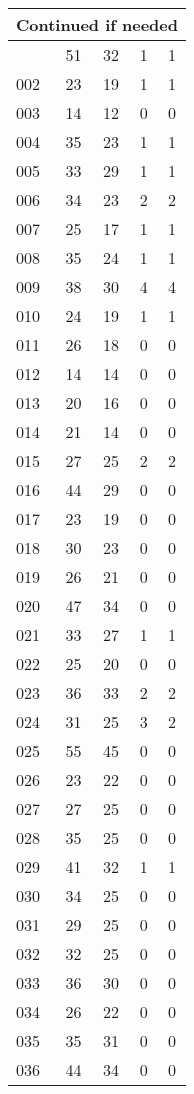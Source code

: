 \begin{center}
\begin{longtable}{l|c|c|c|c}
\hline \multicolumn{5}{|r|}{{Continued if needed}} \\ \hline
\endfoot 
001 & 51 & 32 & 1 & 1\\ \hline
002 & 23 & 19 & 1 & 1\\ \hline
003 & 14 & 12 & 0 & 0\\ \hline
004 & 35 & 23 & 1 & 1\\ \hline
005 & 33 & 29 & 1 & 1\\ \hline
006 & 34 & 23 & 2 & 2\\ \hline
007 & 25 & 17 & 1 & 1\\ \hline
008 & 35 & 24 & 1 & 1\\ \hline
009 & 38 & 30 & 4 & 4\\ \hline
010 & 24 & 19 & 1 & 1\\ \hline
011 & 26 & 18 & 0 & 0\\ \hline
012 & 14 & 14 & 0 & 0\\ \hline
013 & 20 & 16 & 0 & 0\\ \hline
014 & 21 & 14 & 0 & 0\\ \hline
015 & 27 & 25 & 2 & 2\\ \hline
016 & 44 & 29 & 0 & 0\\ \hline
017 & 23 & 19 & 0 & 0\\ \hline
018 & 30 & 23 & 0 & 0\\ \hline
019 & 26 & 21 & 0 & 0\\ \hline
020 & 47 & 34 & 0 & 0\\ \hline
021 & 33 & 27 & 1 & 1\\ \hline
022 & 25 & 20 & 0 & 0\\ \hline
023 & 36 & 33 & 2 & 2\\ \hline
024 & 31 & 25 & 3 & 2\\ \hline
025 & 55 & 45 & 0 & 0\\ \hline
026 & 23 & 22 & 0 & 0\\ \hline
027 & 27 & 25 & 0 & 0\\ \hline
028 & 35 & 25 & 0 & 0\\ \hline
029 & 41 & 32 & 1 & 1\\ \hline
030 & 34 & 25 & 0 & 0\\ \hline
031 & 29 & 25 & 0 & 0\\ \hline
032 & 32 & 25 & 0 & 0\\ \hline
033 & 36 & 30 & 0 & 0\\ \hline
034 & 26 & 22 & 0 & 0\\ \hline
035 & 35 & 31 & 0 & 0\\ \hline
036 & 44 & 34 & 0 & 0\\ \hline

\end{longtable}
\end{center}

